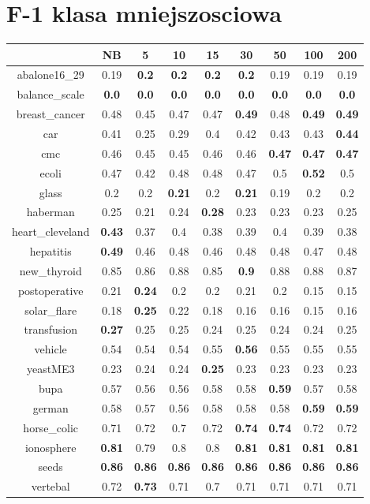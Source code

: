 \documentclass{article}%
\begin{document}
%
\section*{F{-}1 klasa mniejszosciowa}%
\begin{tabular}{c|cccccccc}%
\hline%
&NB&5&10&15&30&50&100&200\\%
\hline%
abalone16\_29&0.19&\textbf{0.2}&\textbf{0.2}&\textbf{0.2}&\textbf{0.2}&0.19&0.19&0.19\\%
\hline%
balance\_scale&\textbf{0.0}&\textbf{0.0}&\textbf{0.0}&\textbf{0.0}&\textbf{0.0}&\textbf{0.0}&\textbf{0.0}&\textbf{0.0}\\%
\hline%
breast\_cancer&0.48&0.45&0.47&0.47&\textbf{0.49}&0.48&\textbf{0.49}&\textbf{0.49}\\%
\hline%
car&0.41&0.25&0.29&0.4&0.42&0.43&0.43&\textbf{0.44}\\%
\hline%
cmc&0.46&0.45&0.45&0.46&0.46&\textbf{0.47}&\textbf{0.47}&\textbf{0.47}\\%
\hline%
ecoli&0.47&0.42&0.48&0.48&0.47&0.5&\textbf{0.52}&0.5\\%
\hline%
glass&0.2&0.2&\textbf{0.21}&0.2&\textbf{0.21}&0.19&0.2&0.2\\%
\hline%
haberman&0.25&0.21&0.24&\textbf{0.28}&0.23&0.23&0.23&0.25\\%
\hline%
heart\_cleveland&\textbf{0.43}&0.37&0.4&0.38&0.39&0.4&0.39&0.38\\%
\hline%
hepatitis&\textbf{0.49}&0.46&0.48&0.46&0.48&0.48&0.47&0.48\\%
\hline%
new\_thyroid&0.85&0.86&0.88&0.85&\textbf{0.9}&0.88&0.88&0.87\\%
\hline%
postoperative&0.21&\textbf{0.24}&0.2&0.2&0.21&0.2&0.15&0.15\\%
\hline%
solar\_flare&0.18&\textbf{0.25}&0.22&0.18&0.16&0.16&0.15&0.16\\%
\hline%
transfusion&\textbf{0.27}&0.25&0.25&0.24&0.25&0.24&0.24&0.25\\%
\hline%
vehicle&0.54&0.54&0.54&0.55&\textbf{0.56}&0.55&0.55&0.55\\%
\hline%
yeastME3&0.23&0.24&0.24&\textbf{0.25}&0.23&0.23&0.23&0.23\\%
\hline%
bupa&0.57&0.56&0.56&0.58&0.58&\textbf{0.59}&0.57&0.58\\%
\hline%
german&0.58&0.57&0.56&0.58&0.58&0.58&\textbf{0.59}&\textbf{0.59}\\%
\hline%
horse\_colic&0.71&0.72&0.7&0.72&\textbf{0.74}&\textbf{0.74}&0.72&0.72\\%
\hline%
ionosphere&\textbf{0.81}&0.79&0.8&0.8&\textbf{0.81}&\textbf{0.81}&\textbf{0.81}&\textbf{0.81}\\%
\hline%
seeds&\textbf{0.86}&\textbf{0.86}&\textbf{0.86}&\textbf{0.86}&\textbf{0.86}&\textbf{0.86}&\textbf{0.86}&\textbf{0.86}\\%
\hline%
vertebal&0.72&\textbf{0.73}&0.71&0.7&0.71&0.71&0.71&0.71\\%
\hline%
\end{tabular}
\end{document}

